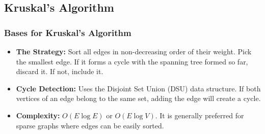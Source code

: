 \subsection{Kruskal's Algorithm}
\subsubsection{Bases for Kruskal's Algorithm}
\begin{itemize}
    \item \textbf{The Strategy:} Sort all edges in non-decreasing order of their weight. Pick the smallest edge. If it forms a cycle with the spanning tree formed so far, discard it. If not, include it.
    \item \textbf{Cycle Detection:} Uses the Disjoint Set Union (DSU) data structure. If both vertices of an edge belong to the same set, adding the edge will create a cycle.
    \item \textbf{Complexity:} $O(E \log E)$ or $O(E \log V)$. It is generally preferred for sparse graphs where edges can be easily sorted.
\end{itemize}


